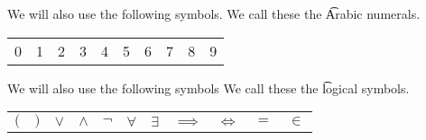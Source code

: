 
We will also use the following symbols.
We call these the \t{Arabic numerals}.
\begin{center}
\begin{tabular}{cccccccccc}
  0 & 1 & 2 & 3 & 4 & 5 & 6 & 7 & 8 & 9\\
\end{tabular}
\end{center}


We will also use the following symbols
We call these the \t{logical symbols}.
\begin{center}
\begin{tabular}{ccccccccccc}
  $($ & $)$ & $\lor$ & $\land$ & $\neg$ & $\forall$ & $\exists$ & $\implies$ & $\iff$ & $=$ & $\in$
\end{tabular}
\end{center}







